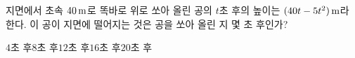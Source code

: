 지면에서 초속 $40\mkern3mu \mathrm{m}$로 똑바로 위로 쏘아 올린 공의 $t$초 후의 높이는 $(40t-5t^2)\mkern3mu \mathrm{m}$라 한다. 이 공이 지면에 떨어지는 것은 공을 쏘아 올린 지 몇 초 후인가?
\begin{choices32}{$4$초 후}{$8$초 후}{$12$초 후}{$16$초 후}{$20$초 후}\end{choices32}
